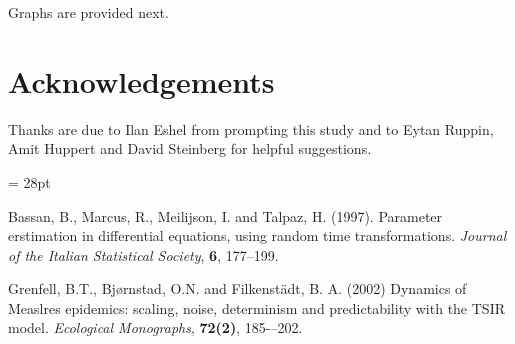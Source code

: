 \documentclass{article}
\begin{document}
Graphs are provided next.



\section*{Acknowledgements}

Thanks are due to Ilan Eshel from prompting this study and to Eytan Ruppin, Amit Huppert and David Steinberg for helpful suggestions.

\baselineskip= 28pt

\begin{thebibliography}{99}

 Bassan, B., Marcus, R., Meilijson, I. and Talpaz, H. (1997). Parameter erstimation in differential equations, using random time transformations. {\em Journal of the Italian Statistical Society}, {\bf 6}, 177--199.

 Grenfell, B.T., Bj{\o}rnstad, O.N. and Filkenst\"{a}dt, B. A. (2002) Dynamics of Measlres epidemics: scaling, noise, determinism and predictability with the TSIR model. {\em Ecological Monographs}, {\bf 72(2)}, 185-–202.


	
\end{thebibliography}
\end{document}
